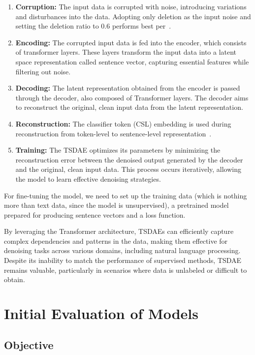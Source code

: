 \documentclass[fleqn,moreauthors,10pt]{ds_report}
\begin{document}
\begin{enumerate}
    \item \textbf{Corruption:} The input data is corrupted with noise, introducing variations and disturbances into the data. Adopting only deletion as the input noise and setting the deletion ratio to 0.6 performs best per~\cite{wang2021tsdae}.
    \item \textbf{Encoding:} The corrupted input data is fed into the encoder, which consists of transformer layers. These layers transform the input data into a latent space representation called sentence vector, capturing essential features while filtering out noise.
    \item \textbf{Decoding:} The latent representation obtained from the encoder is passed through the decoder, also composed of Transformer layers. The decoder aims to reconstruct the original, clean input data from the latent representation.
    \item \textbf{Reconstruction:} The classifier token (CSL) embedding is used during reconstruction from token-level to sentence-level representation~\cite{pinecone_2021}.
    \item \textbf{Training:} The TSDAE optimizes its parameters by minimizing the reconstruction error between the denoised output generated by the decoder and the original, clean input data. This process occurs iteratively, allowing the model to learn effective denoising strategies.
\end{enumerate}

For fine-tuning the model, we need to set up the training data (which is nothing more than text data, since the model is unsupervised), a pretrained model prepared for producing sentence vectors and a loss function.

By leveraging the Transformer architecture, TSDAEs can efficiently capture complex dependencies and patterns in the data, making them effective for denoising tasks across various domains, including natural language processing. Despite its inability to match the performance of supervised methods, TSDAE remains valuable, particularly in scenarios where data is unlabeled or difficult to obtain.

\section*{Initial Evaluation of Models}

\subsection*{Objective}
\end{document}
